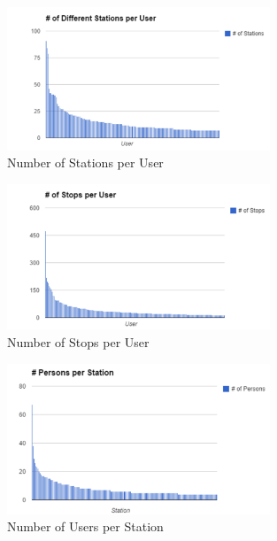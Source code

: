 \begin{figure}[H]
	\centering
	\includegraphics[width=0.7\textwidth]{charts/different_stations_per_user}
	\caption{Number of Stations per User}
\end{figure}


\begin{figure}[H]
	\centering
	\includegraphics[width=0.7\textwidth]{charts/stops_per_user}
	\caption{Number of Stops per User}
\end{figure}

\begin{figure}[H]
	\centering
	\includegraphics[width=0.7\textwidth]{charts/persons_per_station}
	\caption{Number of Users per Station}
\end{figure}

